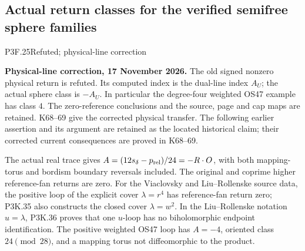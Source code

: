 \subsection{Actual return classes for the verified semifree sphere families}
\begin{statement}{P3F.25}{Refuted; physical-line correction}\par\noindent\textbf{Physical-line correction, 17 November 2026.} The old signed nonzero physical return is refuted. Its computed index is the dual-line index \(A_U\); the actual sphere class is \(-A_U\). In particular the degree-four weighted OS47 example has class \(4\). The zero-reference conclusions and the source, page and cap maps are retained. K68--69 give the corrected physical transfer. The following earlier assertion and its argument are retained as the located historical claim; their corrected current consequences are proved in K68--69.\medskip\par 
The actual real trace gives $A=(12s_\delta-p_{\rm rel})/24=-R\cdot O$, with both mapping-torus and bordism boundary reversals included. The original and coprime higher reference-fan returns are zero. For the Viaclovsky and Liu--Rollenske source data, the positive loop of the explicit cover $\lambda=r^4$ has reference-fan return zero; P3K.35 also constructs the closed cover $\lambda=w^2$. In the Liu--Rollenske notation $u=\lambda$, P3K.36 proves that one $u$-loop has no biholomorphic endpoint identification. The positive weighted OS47 loop has $A=-4$, oriented class $24\pmod{28}$, and a mapping torus not diffeomorphic to the product.
\end{statement}
